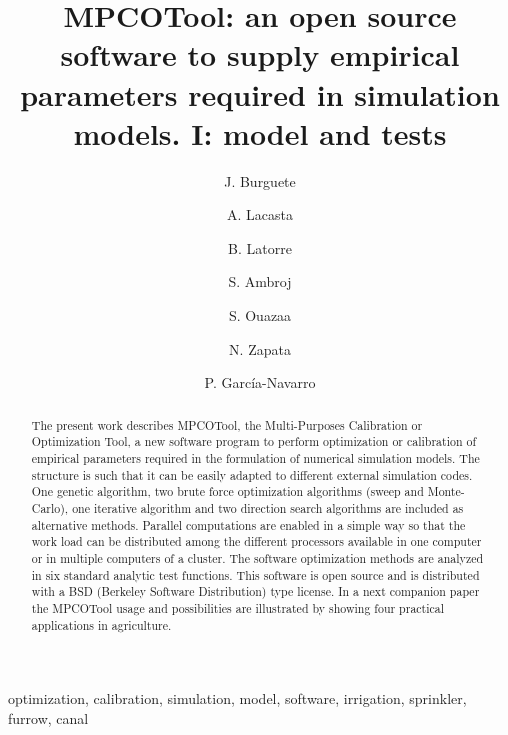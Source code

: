 \documentclass[review,authoryear]{elsarticle}
\begin{document}
\title{MPCOTool: an open source software to supply empirical parameters
required in simulation models. I: model and tests}

\author[eead,bifi]{J. Burguete}

\author[unizar]{A. Lacasta}

\author[eead]{B. Latorre}

\author[kit]{S. Ambroj}

\author[eead]{S. Ouazaa}

\author[eead]{N. Zapata}

\author[unizar]{P. García-Navarro}


\address[eead]{Soil and Water, EEAD / CSIC.
P.O. Box 13034, 50080~Zaragoza, Spain.}
\address[bifi]{BIFI: Instituto de Biocomputación y Física de Sistemas Complejos,
Universidad de Zaragoza.
Mariano Esquillor, Edificio I+D, 50009~Zaragoza, Spain.}
\address[kit]{Steinbuch Centre for Computing (SCC),
Karlsruhe Institute of Technology (KIT).
KIT-Campus Nord, Hermann von Helmholtzplatz 1, 76344 Eggenstein - Leopoldshafen,
Germany.}
\address[unizar]{Fluid Mechanics, LIFTEC, CSIC-Universidad de Zaragoza.
María de Luna 3, 50018~Zaragoza, Spain.}

\begin{keyword}
optimization, calibration, simulation, model, software, irrigation, sprinkler,
furrow, canal
\end{keyword}

\begin{abstract}
The present work describes MPCOTool, the Multi-Purposes Calibration or
Optimization Tool, a new software program to perform
optimization or calibration of empirical parameters required in the
formulation of numerical simulation models. The structure is such that it can be
easily adapted to different external simulation codes.
One genetic algorithm, two brute force optimization algorithms (sweep and
Monte-Carlo), one iterative algorithm
and two direction search algorithms are included as alternative methods.
Parallel computations are enabled in a simple way so that the work load can be
distributed among the different processors available in one computer or in
multiple computers of a cluster.
The software optimization methods are analyzed in six standard analytic test
functions.
This software is open source and is distributed with a BSD (Berkeley Software
Distribution) type license.
In a next companion paper the MPCOTool usage and possibilities are illustrated
by showing four practical applications in agriculture.
\end{abstract}
\end{document}
